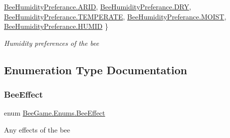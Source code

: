 \begin{DoxyCompactItemize}
\hyperlink{namespace_bee_game_1_1_enums_a66566cbc9da8d1d1e402156b4bd3bf9dacb2b7bbb0e2f3f76538306e5fa548770}{Bee\+Humidity\+Preferance.\+A\+R\+ID}, 
\hyperlink{namespace_bee_game_1_1_enums_a66566cbc9da8d1d1e402156b4bd3bf9da76cca64663bcf77e11df2d5a88fc7d4b}{Bee\+Humidity\+Preferance.\+D\+RY}, 
\hyperlink{namespace_bee_game_1_1_enums_a66566cbc9da8d1d1e402156b4bd3bf9dad5938597ebb26919bd3b131a5f076b35}{Bee\+Humidity\+Preferance.\+T\+E\+M\+P\+E\+R\+A\+TE}, 
\hyperlink{namespace_bee_game_1_1_enums_a66566cbc9da8d1d1e402156b4bd3bf9da8c810d76ac96d2a8ddfe7b859307ad1f}{Bee\+Humidity\+Preferance.\+M\+O\+I\+ST}, 
\newline
\hyperlink{namespace_bee_game_1_1_enums_a66566cbc9da8d1d1e402156b4bd3bf9dae21803baeeb8740c4616bc69a5e35b40}{Bee\+Humidity\+Preferance.\+H\+U\+M\+ID}
 \}\begin{DoxyCompactList}\small\item\em Humidity preferences of the bee \end{DoxyCompactList}
\end{DoxyCompactItemize}


\subsection{Enumeration Type Documentation}
\mbox{\label{namespace_bee_game_1_1_enums_acf7ae32a86385a40fc0c7b55af95c6c3}} 
\subsubsection{\texorpdfstring{Bee\+Effect}{BeeEffect}}
{\footnotesize\ttfamily enum \hyperlink{namespace_bee_game_1_1_enums_acf7ae32a86385a40fc0c7b55af95c6c3}{Bee\+Game.\+Enums.\+Bee\+Effect}\hspace{0.3cm}{\ttfamily [strong]}}



Any effects of the bee 

